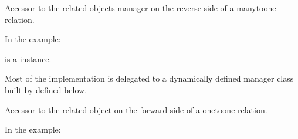 \documentclass[letterpaper,10pt,french]{sphinxmanual}
\begin{document}
\begin{fulllineitems}
\begin{fulllineitems}
\label{\detokenize{main/model:main.models.Comptable.paiement_set}}
\pysigstartsignatures
{}
\pysigstopsignatures
\sphinxAtStartPar
Accessor to the related objects manager on the reverse side of a
many\sphinxhyphen{}to\sphinxhyphen{}one relation.

\sphinxAtStartPar
In the example:

\begin{sphinxVerbatim}[commandchars=\\\{\}]
 
       
\end{sphinxVerbatim}

\sphinxAtStartPar
{} is a  instance.

\sphinxAtStartPar
Most of the implementation is delegated to a dynamically defined manager
class built by  defined below.

\end{fulllineitems}


\begin{fulllineitems}
\label{\detokenize{main/model:main.models.Comptable.personnel_ptr}}
\pysigstartsignatures
{}
\pysigstopsignatures
\sphinxAtStartPar
Accessor to the related object on the forward side of a one\sphinxhyphen{}to\sphinxhyphen{}one relation.

\sphinxAtStartPar
In the example:

\begin{sphinxVerbatim}[commandchars=\\\{\}]
 
       
\end{sphinxVerbatim}


\end{fulllineitems}
\end{fulllineitems}
\end{document}
